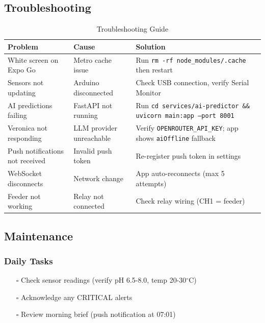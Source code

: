 \documentclass[12pt,a4paper,oneside]{article}
\begin{document}
\subsection{Troubleshooting}
\begin{table}[H]
    \centering\scriptsize
    \begin{tabularx}{\textwidth}{lYl}
        \toprule
        \textbf{Problem} & \textbf{Cause} & \textbf{Solution} \\
        \midrule
        White screen on Expo Go & Metro cache issue & Run \texttt{rm -rf node\_modules/.cache} then restart \\
        Sensors not updating & Arduino disconnected & Check USB connection, verify Serial Monitor \\
        AI predictions failing & FastAPI not running & Run \texttt{cd services/ai-predictor \&\& uvicorn main:app --port 8001} \\
        Veronica not responding & LLM provider unreachable & Verify \texttt{OPENROUTER\_API\_KEY}; app shows \texttt{aiOffline} fallback \\
        Push notifications not received & Invalid push token & Re-register push token in settings \\
        WebSocket disconnects & Network change & App auto-reconnects (max 5 attempts) \\
        Feeder not working & Relay not connected & Check relay wiring (CH1 = feeder) \\
        \bottomrule
    \end{tabularx}
    \caption{Troubleshooting Guide}
\end{table}

\subsection{Maintenance}

\subsubsection{Daily Tasks}
\begin{itemize}
    \item[$\square$] Check sensor readings (verify pH 6.5-8.0, temp 20-30$^\circ$C)
    \item[$\square$] Acknowledge any CRITICAL alerts
    \item[$\square$] Review morning brief (push notification at 07:01)
\end{itemize}
\end{document}
